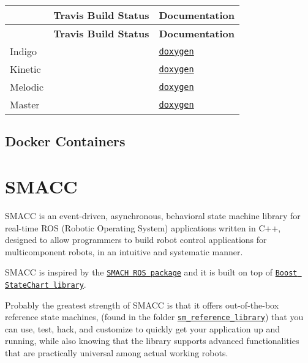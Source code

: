 \tabulinesep=1mm
\begin{longtabu} spread 0pt [c]{*3{|X[-1]}|}
\hline
{}&{\bf Travis Build Status }&{\bf Documentation  }\\
\endfirsthead
\hline
\endfoot
\hline
{}&{\bf Travis Build Status }&{\bf Documentation  }\\
\endhead
Indigo & &\href{https://reelrbtx.github.io/SMACC/indigo-devel/html/md_README.html}{\tt doxygen} \\
Kinetic & &\href{https://reelrbtx.github.io/SMACC/kinetic-devel/html/md_README.html}{\tt doxygen} \\
Melodic & &\href{https://reelrbtx.github.io/SMACC/melodic-devel/html/md_README.html}{\tt doxygen} \\
Master & &\href{https://reelrbtx.github.io/SMACC_Documentation/master/html/namespaces.html}{\tt doxygen} \\
\end{longtabu}


\subsection*{Docker Containers}

\href{https://hub.docker.com/r/pabloinigoblasco/smacc/}{\tt } \href{https://hub.docker.com/r/pabloinigoblasco/smacc/}{\tt } \href{https://registry.hub.docker.com/pabloinigoblasco/smacc/}{\tt }

\section*{S\+M\+A\+CC}

S\+M\+A\+CC is an event-\/driven, asynchronous, behavioral state machine library for real-\/time R\+OS (Robotic Operating System) applications written in C++, designed to allow programmers to build robot control applications for multicomponent robots, in an intuitive and systematic manner.

S\+M\+A\+CC is inspired by the \href{http://wiki.ros.org/smach}{\tt S\+M\+A\+CH R\+OS package} and it is built on top of \href{https://www.boost.org/doc/libs/1_53_0/libs/statechart/doc/index.html}{\tt Boost State\+Chart library}.

Probably the greatest strength of S\+M\+A\+CC is that it offers out-\/of-\/the-\/box reference state machines, (found in the folder \href{https://github.com/reelrbtx/SMACC/tree/master/smacc_sm_reference_library}{\tt sm\+\_\+reference\+\_\+library}) that you can use, test, hack, and customize to quickly get your application up and running, while also knowing that the library supports advanced functionalities that are practically universal among actual working robots.

